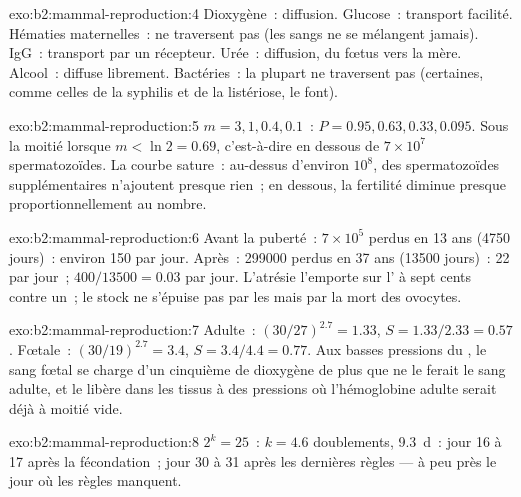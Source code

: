 \begin{solution}{exo:b2:mammal-reproduction:4}
Dioxygène~: diffusion. Glucose~: transport facilité. Hématies
maternelles~: ne traversent pas (les sangs ne se mélangent jamais).
IgG~: transport par un récepteur. Urée~: diffusion, du fœtus vers la
mère. Alcool~: diffuse librement. Bactéries~: la plupart ne traversent
pas (certaines, comme celles de la syphilis et de la listériose, le
font).
\end{solution}

\begin{solution}{exo:b2:mammal-reproduction:5}
$m = 3, 1, 0.4, 0.1$~: $P = 0.95, 0.63, 0.33, 0.095$. Sous la moitié
lorsque $m < \ln 2 = 0.69$, c'est-à-dire en dessous de
$7\times 10^{7}$ spermatozoïdes. La courbe sature~: au-dessus d'environ
$10^{8}$, des spermatozoïdes supplémentaires n'ajoutent presque rien~; en
dessous, la fertilité diminue presque proportionnellement au nombre.
\end{solution}

\begin{solution}{exo:b2:mammal-reproduction:6}
Avant la puberté~: $7\times 10^{5}$ perdus en 13 ans (\num{4750}
jours)~: environ 150 par jour. Après~: \num{299000} perdus en 37 ans
(\num{13500} jours)~: 22 par jour~;  $400/\num{13500} = 0.03$
par jour. L'atrésie l'emporte sur l' à sept cents contre un~;
le stock ne s'épuise pas par les  mais par la mort des
ovocytes.
\end{solution}

\begin{solution}{exo:b2:mammal-reproduction:7}
Adulte~: $(30/27)^{2.7} = 1.33$, $S = 1.33/2.33 = 0.57$. Fœtale~:
$(30/19)^{2.7} = 3.4$, $S = 3.4/4.4 = 0.77$. Aux basses pressions du
, le sang fœtal se charge d'un cinquième de dioxygène de plus
que ne le ferait le sang adulte, et le libère dans les tissus à des
pressions où l'hémoglobine adulte serait déjà à moitié vide.
\end{solution}

\begin{solution}{exo:b2:mammal-reproduction:8}
$2^{k} = 25$~: $k = 4.6$ doublements, \qty{9.3}{d}~: jour 16 à 17 après
la fécondation~; jour 30 à 31 après les dernières règles --- à peu près
le jour où les règles manquent.
\end{solution}

